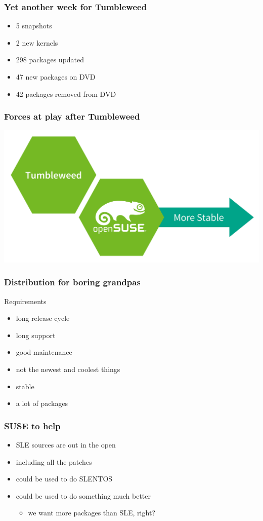 \documentclass{beamer}
\begin{document}
\begin{frame}[t]
\frametitle{Yet another week for Tumbleweed}
\begin{itemize}
\item 5 snapshots
\item 2 new kernels
\item 298 packages updated
\item 47 new packages on DVD
\item 42 packages removed from DVD
\end{itemize}
\end{frame}


\begin{frame}
\frametitle{Forces at play after Tumbleweed}
\begin{center}
\includegraphics[width=.8\paperwidth]{partly-solved}
\end{center}
\end{frame}

\begin{frame}[t]
\frametitle{Distribution for boring grandpas}
Requirements
\begin{itemize}
\item long release cycle
\item long support
\item good maintenance
\item not the newest and coolest things
\item stable
\item a lot of packages
\end{itemize}
\end{frame}


\begin{frame}[t]
\frametitle{SUSE to help}
\begin{itemize}
\item SLE sources are out in the open
\item including all the patches
\item could be used to do SLENTOS
\item could be used to do something much better
\begin{itemize}
\item we want more packages than SLE, right?
\end{itemize}
\end{itemize}
\end{frame}
\end{document}
